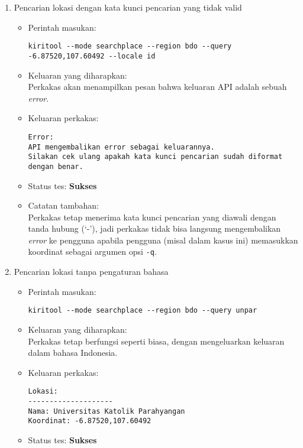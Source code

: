 \begin{enumerate}
	\item Pencarian lokasi dengan kata kunci pencarian yang tidak valid
	\begin{itemize}
		\item Perintah masukan:
		\begin{lstlisting}
kiritool --mode searchplace --region bdo --query -6.87520,107.60492 --locale id
		\end{lstlisting}
		\item Keluaran yang diharapkan: \\
		Perkakas akan menampilkan pesan bahwa keluaran API adalah sebuah \textit{error}.
		\item Keluaran perkakas:
		\begin{lstlisting}
Error:
API mengembalikan error sebagai keluarannya.
Silakan cek ulang apakah kata kunci pencarian sudah diformat dengan benar.
		\end{lstlisting}
		\item Status tes: \textbf{Sukses}
		\item Catatan tambahan: \\
		Perkakas tetap menerima kata kunci pencarian yang diawali dengan tanda hubung (`-'), jadi perkakas tidak bisa langsung mengembalikan \textit{error} ke pengguna apabila pengguna (misal dalam kasus ini) memasukkan koordinat \latlon\xspace sebagai argumen opsi \verb|-q|.
	\end{itemize}
	
	\item Pencarian lokasi tanpa pengaturan bahasa
	\begin{itemize}
		\item Perintah masukan:
		\begin{lstlisting}
kiritool --mode searchplace --region bdo --query unpar
		\end{lstlisting}
		\item Keluaran yang diharapkan: \\
		Perkakas tetap berfungsi seperti biasa, dengan mengeluarkan keluaran dalam bahasa Indonesia.
		\item Keluaran perkakas:
		\begin{lstlisting}
Lokasi:
--------------------
Nama: Universitas Katolik Parahyangan
Koordinat: -6.87520,107.60492
		\end{lstlisting}
		\item Status tes: \textbf{Sukses}
	\end{itemize}
	

\end{enumerate}
